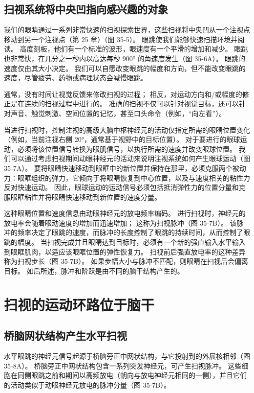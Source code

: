 \subsection{扫视系统将中央凹指向感兴趣的对象}

我们的眼睛通过一系列非常快速的扫视探索世界，这些扫视将中央凹从一个注视点移动到另一个注视点（第 25 章）（图 35-5）。 眼跳使我们能够快速扫描环境并阅读。 高度刻板，他们有一个标准的波形，眼速度有一个平滑的增加和减少。 眼跳也非常快，在几分之一秒内以高达每秒 900° 的角速度发生（图 35-6A）。 眼跳的速度仅由其大小决定。 我们可以自愿改变眼跳的幅度和方向，但不能改变眼跳的速度，尽管疲劳、药物或病理状态会减慢眼跳。

通常，没有时间让视觉反馈来修改扫视的过程； 相反，对运动方向和/或幅度的修正是在连续的扫视过程中进行的。 准确的扫视不仅可以针对视觉目标，还可以针对声音、触觉刺激、空间位置的记忆，甚至口头命令（例如，“向左看”）。

当进行扫视时，控制注视的高级大脑中枢神经元的活动仅指定所需的眼睛位置变化（例如，当前注视右侧 20°，通常基于视野中的目标位置）。 对于要进行的眼球运动，必须将该位置信号转换为眼肌信号，以执行所需的速度并改变眼球位置。 我们可以通过考虑扫视期间动眼神经元的活动来说明注视系统如何产生眼球运动（图 35-7A）。 要将眼睛快速移动到眼眶中的新位置并保持在那里，必须克服两个被动力：眼眶组织的弹力，它倾向于将眼睛恢复到中心位置，以及与速度相关的粘性力 反对快速运动。 因此，眼球运动的运动信号必须包括抵消弹性力的位置分量和克服眼眶粘性并将眼睛快速移动到新位置的速度分量。

这种眼睛位置和速度信息由动眼神经元的放电频率编码。 进行扫视时，神经元的放电率会随着眼动速度的增加而迅速增加； 这称为扫视脉冲（图 35-7B）。 该脉冲的频率决定了眼跳的速度，而脉冲的长度控制了眼跳的持续时间，从而控制了眼跳的幅度。 当扫视完成并且眼睛达到目标时，必须有一个新的强直输入水平输入到眼眶肌肉，以适应该眼眶位置的弹性恢复力。 扫视前后强直放电率的这种差异称为扫视步长（图 35-7B）。 如果步幅大小与脉冲不匹配，则眼睛在扫视后会偏离目标。 如后所述，脉冲和阶跃是由不同的脑干结构产生的。

\section{扫视的运动环路位于脑干}
\subsection{桥脑网状结构产生水平扫视}
水平眼跳的神经元信号起源于桥脑旁正中网状结构，与它投射到的外展核相邻（图 35-8A）。 桥脑旁正中网状结构包含一系列突发神经元，可产生扫视脉冲。 这些细胞在同侧眼跳之前和期间以高频放电（朝向与放电神经元相同的一侧），并且它们的活动类似于动眼神经元放电的脉冲分量（图 35-7B）。

